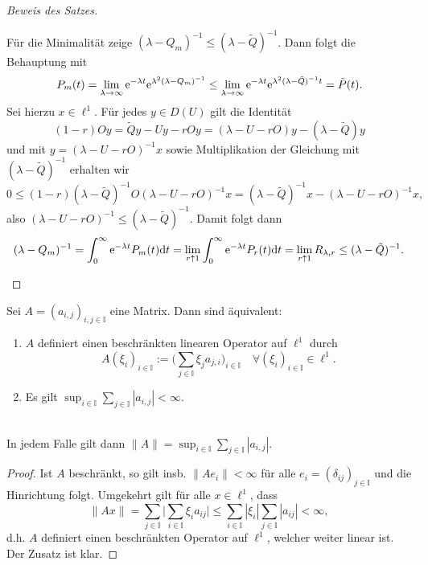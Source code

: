 \begin{proof}[Beweis des Satzes]
\begin{enumerate}
  \par Für die Minimalität zeige $(\lambda - Q_m)^{-1}\leq (\lambda-\tilde Q)^{-1}$. Dann folgt die Behauptung mit
  $$P_m(t)=\lim_{\lambda\to\infty}\text e^{-\lambda t}\text e^{\lambda^2 (\lambda - Q_m)^{-1}}\leq\lim_{\lambda\to\infty}\text e^{-\lambda t}\text e^{\lambda^2(\lambda -\tilde Q)^{-1}t}=\tilde P(t).$$
  Sei hierzu $x\in\ell^1$. Für jedes $y\in D(U)$ gilt die Identität $$(1-r)Oy = \tilde Qy - Uy-rOy=(\lambda - U - rO)y-(\lambda - \tilde Q)y$$ und mit $y=(\lambda - U -rO)^{-1}x$ sowie Multiplikation der Gleichung mit $(\lambda-\tilde Q)^{-1}$ erhalten wir $$0\leq(1-r)(\lambda-\tilde Q)^{-1} O(\lambda - U-rO)^{-1}x=(\lambda- \tilde Q)^{-1}x-(\lambda- U-rO)^{-1}x,$$
  also $(\lambda-U-rO)^{-1}\leq (\lambda -\tilde Q)^{-1}$. Damit folgt  dann$$(\lambda-Q_m)^{-1}=\int_0^\infty \text e^{-\lambda t}P_m(t)\text dt = \lim_{r\uparrow 1}\int_0^\infty \text e^{-\lambda t}P_r(t)\text dt=\lim_{r\uparrow 1} R_{\lambda, r}\leq (\lambda- \tilde Q)^{-1}.$$
  \end{enumerate}
\end{proof}



\begin{prop}
  Sei $A=(a_{i,j})_{i,j\in\mathbb I}$ eine Matrix. Dann sind äquivalent:
  \begin{enumerate}
      \item $A$ definiert einen beschränkten linearen Operator auf $\ell^1$ durch  $$A(\xi_i)_{i\in \mathbb I}:=\Bigg(\sum_{j\in\mathbb I}\xi_j a_{j,i}\Bigg)_{i\in\mathbb I}\quad \forall (\xi_i)_{i\in\mathbb I}\in\ell^1.$$
      \item Es gilt $\sup_{i\in\mathbb I}\sum_{j\in\mathbb I}|a_{i,j}|<\infty$.
\end{enumerate}~\\
  In jedem Falle gilt dann $\|A\|=\sup_{i\in\mathbb I}\sum_{j\in\mathbb I}|a_{i,j}|$.
\end{prop}

\begin{proof}
Ist $A$ beschränkt, so gilt insb. $\|Ae_i\|<\infty$ für alle $e_i=(\delta_{ij})_{j\in \mathbb I}$ und die Hinrichtung folgt. Umgekehrt gilt für alle $x\in \ell^1$, dass
$$\|Ax\|=\sum_{j\in\mathbb I}\Bigg|\sum_{i\in\mathbb I}\xi_i a_{ij}\Bigg|\leq\sum_{i\in\mathbb I}|\xi_i|\sum_{j\in\mathbb I}|a_{ij}|<\infty,$$ d.h. $A$ definiert einen beschränkten Operator auf $\ell^1$, welcher weiter linear ist. Der Zusatz ist klar.
\end{proof}


